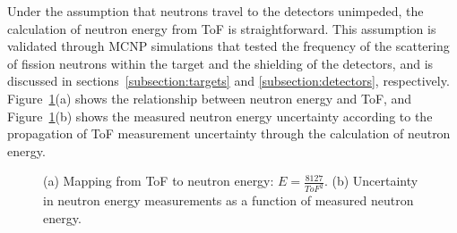 Under the assumption that neutrons travel to the detectors unimpeded, the calculation of neutron energy from ToF is straightforward.
This assumption is validated through MCNP simulations that tested the frequency of the scattering of fission neutrons within the target and the shielding of the detectors, and is discussed in sections~\ref{subsection:targets} and \ref{subsection:detectors}, respectively.
Figure~\ref{fig:ErgUncertainty}(a) shows the relationship between neutron energy and ToF, and Figure~\ref{fig:ErgUncertainty}(b) shows the measured neutron energy uncertainty according to the propagation of ToF measurement uncertainty through the calculation of neutron energy.
\begin{figure}[]
    \caption{(a) Mapping from ToF to neutron energy: $E = \frac{8127}{ToF^{2}}$.
    (b) Uncertainty in neutron energy measurements as a function of measured neutron energy.}
    \label{fig:ErgUncertainty}
\end{figure}

